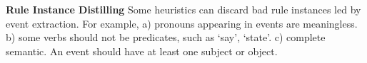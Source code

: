 
\textbf{Rule Instance Distilling} Some heuristics can discard bad rule instances led by event extraction. For example, a) pronouns appearing in events are meaningless. b) some verbs should not be predicates, such as `say', `state'. c) complete semantic. An event should have at least one subject or object.

